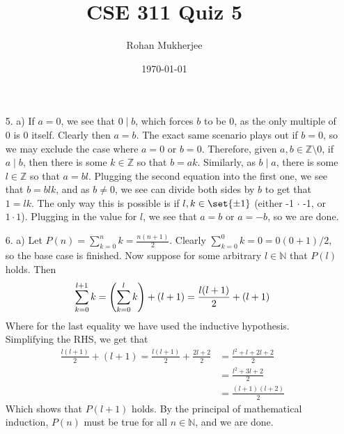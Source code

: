 \documentclass[12pt]{article}
\title{CSE 311 Quiz 5}
\date{\today}
\author{Rohan Mukherjee}
\def\mbb#1{\mathbb{#1}}
\def\bN{\mbb{N}}
\def\bZ{\mbb{Z}}
\theoremstyle{definition}
\theoremstyle{remark}
\begin{document}
	\maketitle
	\begin{enumerate}
		\item[5. a)] If $a = 0$, we see that $0 \mid b$, which forces $b$ to be 0, as the only multiple of 0 is 0 itself. Clearly then $a = b$. The exact same scenario plays out if $b = 0$, so we may exclude the case where $a = 0$ or $b = 0$. Therefore, given $a, b \in \bZ \setminus 0$, if $a \mid b$, then there is some $k \in \bZ$ so that $b = ak$. Similarly, as $b \mid a$, there is some $l \in \bZ$ so that $a = bl$. Plugging the second equation into the first one, we see that $b = blk$, and as $b \neq 0$, we see can divide both sides by $b$ to get that $1 = lk$. The only way this is possible is if $l, k \in \set{\pm 1}$ (either -1 $\cdot$ -1, or $1 \cdot 1$). Plugging in the value for $l$, we see that $a = b$ or $a = -b$, so we are done.
		
		\item[6. a)] Let $P(n) = \sum_{k=0}^{n} k = \frac{n(n+1)}{2}$. Clearly $\sum_{k=0}^{0} k = 0 = 0(0+1)/2$, so the base case is finished. Now suppose for some arbitrary $l \in \bN$ that $P(l)$ holds. Then 
		\begin{align*}
			\sum_{k=0}^{l+1} k = \qty(\sum_{k=0}^l k) + (l+1) = \frac{l(l+1)}{2} + (l+1)
		\end{align*}
		Where for the last equality we have used the inductive hypothesis. Simplifying the RHS, we get that
		\begin{align*}
			\frac{l(l+1)}{2} + (l+1) = \frac{l(l+1)}{2} + \frac{2l+2}{2} &= \frac{l^2+l+2l+2}{2} \\
			&= \frac{l^2+3l+2}{2} \\
			&= \frac{(l+1)(l+2)}{2}
		\end{align*}
		Which shows that $P(l+1)$ holds. By the principal of mathematical induction, $P(n)$ must be true for all $n \in \bN$, and we are done.
	\end{enumerate}
\end{document}
